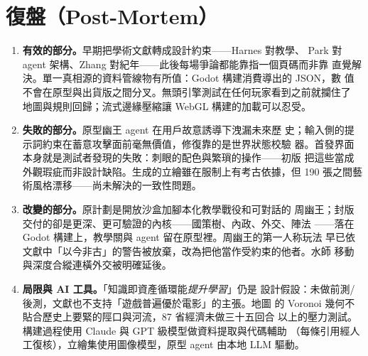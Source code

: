 \documentclass[12pt,a4paper]{article}
\renewcommand{\footnotesize}{\fontsize{10}{12}\selectfont}
\begin{document}
\section{復盤（Post-Mortem）}
\label{sec:postmortem}

\begin{enumerate}
  \item \textbf{有效的部分。}早期把學術文獻轉成設計約束——Harnes 對教學、
  Park 對 agent 架構、Zhang 對紀年——此後每場爭論都能靠指一個頁碼而非靠
  直覺解決。單一真相源的資料管線物有所值：Godot 構建消費導出的 JSON，數
  值不會在原型與出貨版之間分叉。無頭引擎測試在任何玩家看到之前就攔住了
  地圖與規則回歸；流式邊緣壓縮讓 WebGL 構建的加載可以忍受。
  \item \textbf{失敗的部分。}原型幽王 agent 在用戶故意誘導下洩漏未來歷
  史；輸入側的提示詞約束在蓄意攻擊面前毫無價值，修復靠的是世界狀態校驗
  器。首發界面本身就是測試者發現的失敗：刺眼的配色與繁瑣的操作——初版
  把這些當成外觀瑕疵而非設計缺陷。生成的立繪雖在服制上有考古依據，但
  190 張之間藝術風格漂移——尚未解決的一致性問題。
  \item \textbf{改變的部分。}原計劃是開放沙盒加腳本化教學戰役和可對話的
  周幽王；封版交付的卻是更深、更可驗證的內核——國策樹、內政、外交、陣法
  ——落在 Godot 構建上，教學關與 agent 留在原型裡。周幽王的第一人称玩法
  早已依文獻中「以今非古」的警告被放棄，改為把他當作受約束的他者。水師
  移動與深度合縱連橫外交被明確延後。
  \item \textbf{局限與 AI 工具。}「知識即資產循環能\emph{提升學習}」仍是
  設計假設：未做前測/後測，文獻也不支持「遊戲普遍優於電影」的主張。地圖
  的 Voronoi 幾何不貼合歷史上要緊的陘口與河流，87 省經濟未做三十五回合
  以上的壓力測試。構建過程使用 Claude 與 GPT 級模型做資料提取與代碼輔助
  （每條引用經人工復核），立繪集使用圖像模型，原型 agent 由本地 LLM 驅動。
\end{enumerate}

\singlespacing
\footnotesize
\printbibliography[title={參考文獻}]
\end{document}
